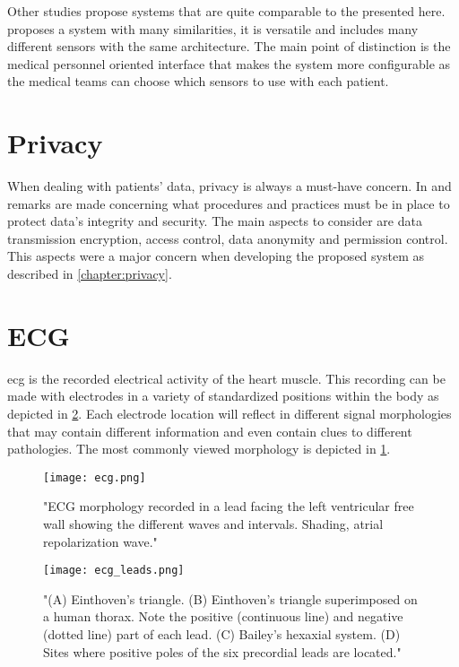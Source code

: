 Other studies propose systems that are quite comparable to the presented here.  proposes a system with many similarities, it is versatile and includes many different sensors with the same architecture. The main point of distinction is the medical personnel oriented interface that makes the system more configurable as the medical teams can choose which sensors to use with each patient.

\section{Privacy}

When dealing with patients' data, privacy is always a must-have concern. In \citet{b_data_pervasive} and \citet{b_data} remarks are made concerning what procedures and practices must be in place to protect data's integrity and security. The main aspects to consider are data transmission encryption, access control, data anonymity and permission control. This aspects were a major concern when developing the proposed system as described in \cref{chapter:privacy}.


\section{ECG}

\ac{ecg} is the recorded electrical activity of the heart muscle. This recording can be made with electrodes in a variety of standardized positions within the body as depicted in \cref{figure:ecg_leads}. Each electrode location will reflect in different signal morphologies that may contain different information and even contain clues to different pathologies. The most commonly viewed morphology is depicted in \cref{figure:ecg}.

\begin{figure}[!h]
	\centering
	\texttt{[image: ecg.png]}
	\caption{\citet{b_ecg} "ECG morphology recorded 
		in a lead facing the left ventricular free
		wall showing the different waves and
		intervals. Shading, atrial repolarization
		wave."}
	\label{figure:ecg}
\end{figure}

\begin{figure}[!h]
	\centering
	\texttt{[image: ecg\_leads.png]}
	\caption{\citet{b_ecg} 
		"(A) Einthoven’s triangle. (B) Einthoven’s triangle superimposed on a human thorax. Note the positive (continuous line) and
		negative (dotted line) part of each lead. (C) Bailey’s hexaxial system. (D) Sites where positive poles of the six precordial leads are located."}
	\label{figure:ecg_leads}
\end{figure}

